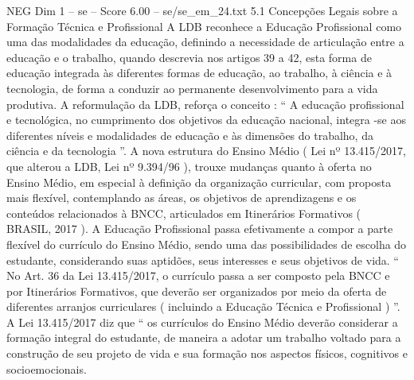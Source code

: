 \begin{textsample}{NEG Dim 1 – se – Score 6.00 – se/se\_em\_24.txt}  \label{ex:f1_neg_204}
5.1 Concepções Legais sobre a Formação Técnica e Profissional A LDB reconhece a Educação Profissional como uma das modalidades da educação, definindo a necessidade de articulação entre a educação e o trabalho, quando descrevia nos artigos 39 a 42, esta forma de educação integrada às diferentes formas de educação, ao trabalho, à ciência e à tecnologia, de forma a conduzir ao permanente desenvolvimento para a vida produtiva.
A reformulação da LDB, reforça o conceito : “ A educação profissional e tecnológica, no cumprimento dos objetivos da educação nacional, integra -se aos diferentes níveis e modalidades de educação e às dimensões do trabalho, da ciência e da tecnologia ”.
A nova estrutura do Ensino Médio ( Lei nº 13.415/2017, que alterou a LDB, Lei nº 9.394/96 ), trouxe mudanças quanto à oferta no Ensino Médio, em especial à definição da organização curricular, com proposta mais flexível, contemplando as áreas, os objetivos de aprendizagens e os conteúdos relacionados à BNCC, articulados em Itinerários Formativos ( BRASIL, 2017 ).
A Educação Profissional passa efetivamente a compor a parte flexível do currículo do Ensino Médio, sendo uma das possibilidades de escolha do estudante, considerando suas aptidões, seus interesses e seus objetivos de vida. “ No Art. 36 da Lei 13.415/2017, o currículo passa a ser composto pela BNCC e por Itinerários Formativos, que deverão ser organizados por meio da oferta de diferentes arranjos curriculares ( incluindo a Educação Técnica e Profissional ) ”.
A Lei 13.415/2017 diz que “ os currículos do Ensino Médio deverão considerar a formação integral do estudante, de maneira a adotar um trabalho voltado para a construção de seu projeto de vida e sua formação nos aspectos físicos, cognitivos e socioemocionais.

\end{textsample}
